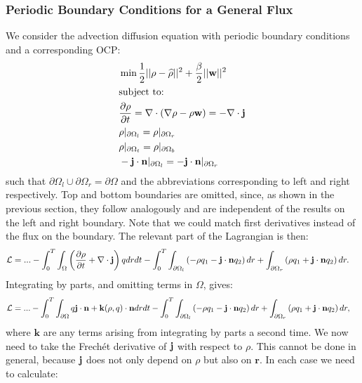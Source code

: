 	
		
	\subsubsection{Periodic Boundary Conditions for a General Flux}
	
	We consider the advection diffusion equation with periodic boundary conditions and a corresponding OCP:
	\begin{align*}
		&\min \frac{1}{2}|| \rho - \widehat \rho||^2 + \frac{\beta}{2}||\mathbf{w}||^2\\
		&\text{subject to:}\\
		&\frac{\partial \rho}{\partial t} = \nabla \cdot \left(\nabla \rho - \rho \mathbf{w}\right) = -\nabla \cdot \mathbf j\\
		& \rho|_{\partial \Omega_l} = \rho|_{\partial \Omega_r}\\
		& \rho|_{\partial \Omega_t} = \rho|_{\partial \Omega_b}\\
		& - \mathbf j \cdot \mathbf{n} |_{\partial \Omega_l}= - \mathbf j \cdot \mathbf{n}|_{\partial \Omega_r}
	\end{align*}
	such that $\partial\Omega_l \cup \partial\Omega_r = \partial \Omega$ and the abbreviations corresponding to left and right respectively. Top and bottom boundaries are omitted, since, as shown in the previous section, they follow analogously and are independent of the results on the left and right boundary. Note that we could match first derivatives instead of the flux on the boundary.
	The relevant part of the Lagrangian is then:
	\begin{align*}
		\mathcal{L} &= ... -\int_0^T \int_\Omega \left(\frac{\partial \rho}{\partial t} + \nabla \cdot \mathbf j\right)q dr dt - \int_0^T \int_{\partial \Omega_l} \left(- \rho q_1 - \mathbf j \cdot \mathbf{n} q_2 \right) dr  + \int_{\partial \Omega_r} \left(\rho q_1 +  \mathbf j \cdot \mathbf{n} q_2  \right)  dr .
	\end{align*}
	Integrating by parts, and omitting terms in $\Omega$, gives:
	\begin{align*}
		\mathcal{L} &= ... - \int_0^T \int_{\partial \Omega} q \mathbf j  \cdot \mathbf{n} + \mathbf{k}(\rho, q) \cdot \mathbf{n}  dr dt - \int_0^T \int_{\partial \Omega_l} \left(- \rho q_1 - \mathbf j \cdot \mathbf{n} q_2 \right)   dr  + \int_{\partial \Omega_r} \left(\rho q_1 + \mathbf j \cdot \mathbf{n} q_2 \right)   dr, 
	\end{align*}
	where $\mathbf{k}$ are any terms arising from integrating by parts a second time.
	We now need to take the Frech\'et derivative of $\mathbf j$ with respect to $\rho$. This cannot be done in general, because $\mathbf j$ does not only depend on $\rho$ but also on $\mathbf r$. In each case we need to calculate:
